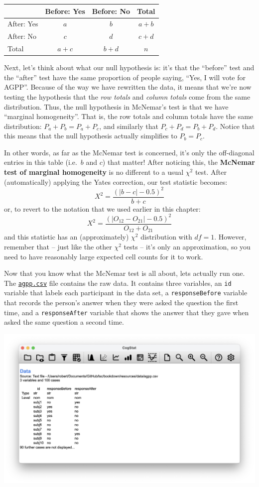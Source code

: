 \documentclass[
]{book}
\theoremstyle{definition}
\theoremstyle{definition}
\theoremstyle{definition}
\theoremstyle{definition}
\theoremstyle{remark}
\begin{document}
\begin{longtable}[]{@{}lccc@{}}
\toprule()
& Before: Yes & Before: No & Total \\
\midrule()
\endhead
After: Yes & \(a\) & \(b\) & \(a+b\) \\
After: No & \(c\) & \(d\) & \(c+d\) \\
Total & \(a+c\) & \(b+d\) & \(n\) \\
\bottomrule()
\end{longtable}

Next, let's think about what our null hypothesis is: it's that the ``before'' test and the ``after'' test have the same proportion of people saying, ``Yes, I will vote for AGPP''. Because of the way we have rewritten the data, it means that we're now testing the hypothesis that the \emph{row totals} and \emph{column totals} come from the same distribution. Thus, the null hypothesis in McNemar's test is that we have ``marginal homogeneity''. That is, the row totals and column totals have the same distribution: \(P_a + P_b = P_a + P_c\), and similarly that \(P_c + P_d = P_b + P_d\). Notice that this means that the null hypothesis actually simplifies to \(P_b = P_c\).

In other words, as far as the McNemar test is concerned, it's only the off-diagonal entries in this table (i.e.~\(b\) and \(c\)) that matter! After noticing this, the \textbf{McNemar test of marginal homogeneity} is no different to a usual \(\chi^2\) test. After (automatically) applying the Yates correction, our test statistic becomes:
\[
X^2 = \frac{(|b-c| - 0.5)^2}{b+c}
\]
or, to revert to the notation that we used earlier in this chapter:
\[
X^2 = \frac{(|O_{12}-O_{21}| - 0.5)^2}{O_{12} + O_{21}}
\]
and this statistic has an (approximately) \(\chi^2\) distribution with \(df=1\). However, remember that -- just like the other \(\chi^2\) tests -- it's only an approximation, so you need to have reasonably large expected cell counts for it to work.

Now that you know what the McNemar test is all about, lets actually run one. The \href{resources/data/agpp.csv}{\texttt{agpp.csv}} file contains the raw data. It contains three variables, an \texttt{id} variable that labels each participant in the data set, a \texttt{responseBefore} variable that records the person's answer when they were asked the question the first time, and a \texttt{responseAfter} variable that shows the answer that they gave when asked the same question a second time.

\begin{center}\includegraphics[width=0.66\linewidth]{resources/image/cogstatloadagpp} \end{center}
\end{document}
